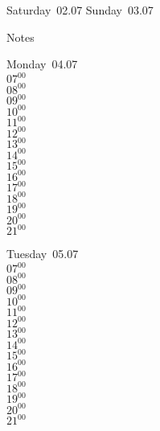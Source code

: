 \documentclass[11pt,a4paper]{book}\usepackage[]{graphicx}\usepackage[]{color}
\begin{document}
\begin{weekendbox}
  Saturday~02.07
  \tcblower
  Sunday~03.07
\end{weekendbox} %
\begin{notebox}
  Notes
\end{notebox}
\clearpage
\begin{headerbox}
\end{headerbox}
\begin{weekdaybox}
  Monday~04.07\\
  { 
  \vfill
  $07^{00}$\\
$08^{00}$\\
$09^{00}$\\
$10^{00}$\\
$11^{00}$\\
$12^{00}$\\
$13^{00}$\\
$14^{00}$\\
$15^{00}$\\
$16^{00}$\\
$17^{00}$\\
$18^{00}$\\
$19^{00}$\\
$20^{00}$\\
$21^{00}$\\
  }
\end{weekdaybox}
\begin{weekdaybox}
  Tuesday~05.07\\
  { 
  \vfill
  $07^{00}$\\
$08^{00}$\\
$09^{00}$\\
$10^{00}$\\
$11^{00}$\\
$12^{00}$\\
$13^{00}$\\
$14^{00}$\\
$15^{00}$\\
$16^{00}$\\
$17^{00}$\\
$18^{00}$\\
$19^{00}$\\
$20^{00}$\\
$21^{00}$\\
  }
\end{weekdaybox}
\end{document}

